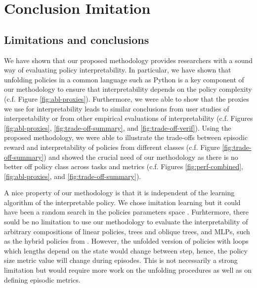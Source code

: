 \chapter{Conclusion Imitation}
\section{Limitations and conclusions}\label{sec:ccl}
We have shown that our proposed methodology provides researchers with a sound way of evaluating policy interpretability. In particular, we have shown that unfolding policies in a common language such as Python is a key component of our methodology to ensure that interpretability depends on the policy complexity (c.f. Figure \ref{fig:abl-proxies}). Furthermore, we were able to show that the proxies we use for interpretability leads to similar conclusions from user studies of interpretability or from other empirical evaluations of interpretability (c.f. Figures \ref{fig:abl-proxies}, \ref{fig:trade-off-summary}, and \ref{fig:trade-off-verif}). Using the proposed methodology, we were able to illustrate the trade-offs between episodic reward and interpretability of policies from different classes (c.f. Figure \ref{fig:trade-off-summary}) and showed the crucial need of our methodology as there is no better off policy class across tasks and metrics (c.f. Figures \ref{fig:perf-combined}, \ref{fig:abl-proxies}, and \ref{fig:trade-off-summary}). 

A nice property of our methodology is that it is independent of the learning algorithm of the interpretable policy. We chose imitation learning but it could have been a random search in the policies parameters space \cite{empirical-evidence}. Furhtermore, there sould be no limitation to use our methodology to evaluate the interpretability of arbitrary compositions of linear policies, trees and oblique trees, and MLPs, such as the hybrid policies from \cite{shindo2024blendrl}. However, the unfolded version of policies with loops which lengths depend on the state would change between step, hence, the policy size metric value will change during episodes. This is not necessarily a strong limitation but would require more work on the unfolding procedures as well as on defining episodic metrics. 

